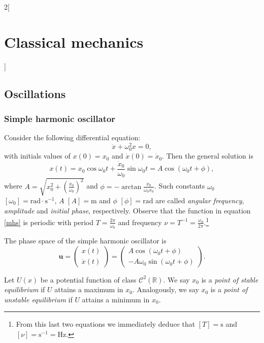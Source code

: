 \documentclass[../../../main.tex]{subfiles}
\begin{document}
\begin{multicols}{2}[\section{Classical mechanics}]
\subsection{Oscillations}
\subsubsection*{Simple harmonic oscillator}
\begin{concept}
    Consider the following differential equation: $$\ddot{x}+\omega_0^2 x=0,$$ with initials values of $x(0)=x_0$ and $\dot{x}(0)=\dot{x}_0$. Then the general solution is 
    \begin{equation}
        x(t)=x_0\cos\omega_0t+\frac{\dot{x}_0}{\omega_0}\sin\omega_0t=A\cos(\omega_0t+\phi),
        \label{mhs}
    \end{equation} where $\displaystyle A=\sqrt{x_0^2+\left(\frac{\dot{x}_0}{\omega_0}\right)^2}$ and $\displaystyle \phi=-\arctan\frac{\dot{x}_0}{\omega_0x_0}$. Such constants $\omega_0$ $[\omega_0]=\text{rad}\cdot \text{s}^{-1}$, $A$ $[A]=\text{m}$ and $\phi$ $[\phi]=\text{rad}$ are called \textit{angular frequency}, \textit{amplitude} and \textit{initial phase}, respectively. Observe that the function in equation \eqref{mhs} is periodic with period $T=\frac{2\pi}{\omega_0}$ and frequency $\nu=T^{-1}=\frac{\omega_0}{2\pi}$.\footnote{From this last two equations we immediately deduce that $[T]=\text{s}$ and $[\nu]=\text{s}^{-1}=\text{Hz}$.}
\end{concept}
\begin{concept}
    The phase space of the simple harmonic oscillator is $$\boldsymbol{u}=
    \begin{pmatrix}
        x(t)\\
        \dot{x}(t)
    \end{pmatrix}=
    \begin{pmatrix}
        A\cos(\omega_0t+\phi)\\
        -A\omega_0\sin(\omega_0t+\phi)
    \end{pmatrix}.$$
\end{concept}
\begin{definition}
    Let $U(x)$ be a potential function of class $\mathcal{C}^2(\mathbb{R})$. We say $x_0$ is a \textit{point of stable equilibrium} if $U$ attains a maximum in $x_0$. Analogously, we say $x_0$ is a \textit{point of unstable equilibrium} if $U$ attains a minimum in $x_0$.
\end{definition}
\begin{concept}

\end{concept}
\end{multicols}
\end{document}
